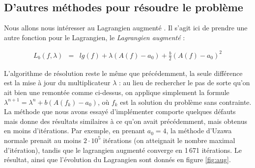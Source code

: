 \documentclass[10pt,a4paper]{article}
\theoremstyle{plain}
\theoremstyle{definition}
\begin{document}
\subsection{D'autres méthodes pour résoudre le problème}

Nous allons nous intéresser au Lagrangien augmenté \cite{cohen00}. Il s'agit ici de prendre une autre fonction pour le Lagrangien, le \emph{Lagrangien augmenté} :

\begin{eqnarray*}
L_b(f,\lambda)&=& lg(f) + \lambda\left(A(f)-a_0\right) + \frac{b}{2}\left(A(f)-a_0\right)^2
\end{eqnarray*}

L'algorithme de résolution reste le même que précédemment, la seule différence est la mise à jour du multiplicateur $\lambda$ : au lieu de rechercher le pas de sorte qu'on ait bien une remontée comme ci-dessus, on applique simplement la formule $\lambda^{n+1} = \lambda^n+b(A(f_k)-a_0)$, où $f_k$ est la solution du problème sans contrainte. La méthode que nous avons essayé d'implémenter comporte quelques défauts mais donne des résultats similaires à ce qu'on avait précédemment, mais obtenus en moins d'itérations.
Par exemple, en prenant $a_0=4$, la méthode d'Uzawa \og normale \fg{} prenait au moins $2\cdot 10^5$ itérations (on atteignait le nombre maximal d'itération), tandis que le lagrangien augmenté converge en 1\,671 itérations. Le résultat, ainsi que l'évolution du Lagrangien sont donnés en figure \ref{fig:aug}.
\end{document}
